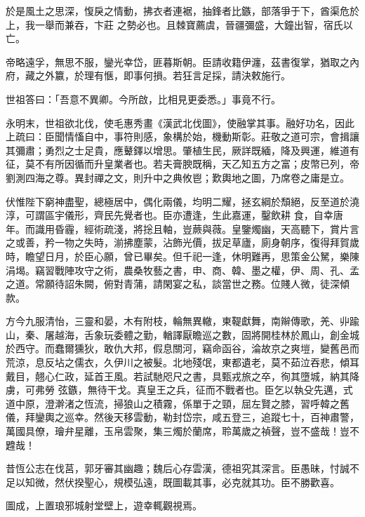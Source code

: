 \begin{pinyinscope}
 於是風土之思深，愎戾之情動，拂衣者連裾，抽鋒者比鏃，部落爭于下，酋渠危於上，我一舉而兼吞，卞莊
 之勢必也。且棘寶薦虞，晉疆彌盛，大鐘出智，宿氏以亡。



 帝略遠孚，無思不服，鑾光幸岱，匪暮斯朝。臣請收籍伊瀍，茲書復掌，猶取之內府，藏之外籝，於理有愜，即事何損。若狂言足採，請決敕施行。



 世祖答曰：「吾意不異卿。今所啟，比相見更委悉。」事竟不行。



 永明末，世祖欲北伐，使毛惠秀畫《漢武北伐圖》，使融掌其事。融好功名，因此上疏曰：臣聞情慉自中，事符則感，象構於始，機動斯彰。莊敬之道可宗，會揖讓其彌肅；勇烈之士足貴，應鼙鐸以增思。肇植生民，厥詳既緬，降及興運，維道有征，莫不有所因循而升皇業者也。若夫膏腴既稱，天乙知五方之富；皮幣已列，帝劉測四海之尊。異封禪之文，則升中之典攸鬯；歎輿地之圖，乃席卷之庸是立。



 伏惟陛下窮神盡聖，總極居中，偶化兩儀，均明二耀，拯玄綱於頹絕，反至道於澆淳，可謂區宇儀形，齊民先覺者也。臣亦遭逢，生此嘉運，鑿飲耕
 食，自幸唐年。而識用昏霾，經術疏淺，將捴且軸，豈蕨與薇。皇鑒燭幽，天高聽下，賞片言之或善，矜一物之失時，湔拂塵蒙，沾飾光價，拔足草廬，廁身朝序，復得拜賀歲時，瞻望日月，於臣心願，曾已畢矣。但千祀一逢，休明難再，思策金公駑，樂陳涓堨。竊習戰陣攻守之術，農桑牧藝之書，申、商、韓、墨之權，伊、周、孔、孟之道。常願待詔朱闕，俯對青蒲，請閑宴之私，談當世之務。位賤人微，徒深傾款。



 方今九服清怡，三靈和晏，木有附枝，輪無異轍，東鞮獻舞，南辮傳歌，羌、丱踰山，秦、屠越海，舌象玩委體之勤，輶譯厭瞻巡之數，固將開桂林於鳳山，創金城於西守。而蠢爾獯狄，敢仇大邦，假息關河，竊命函谷，淪故京之爽塏，變舊邑而荒涼，息反坫之儒衣，久伊川之被髮。北地殘氓，東都遺老，莫不茹泣吞悲，傾耳戴目，翹心仁政，延首王風。若試馳咫尺之書，具甄戎旅之卒，徇其墮城，納其降虜，可弗勞
 弦鏃，無待干戈。真皇王之兵，征而不戰者也。臣乞以執殳先邁，式道中原，澄澣渚之恆流，掃狼山之積霧，係單于之頸，屈左賢之膝，習呼韓之舊儀，拜鑾輿之巡幸。然後天移雲動，勒封岱宗，咸五登三，追蹤七十，百神肅警，萬國具僚，璯弁星離，玉帛雲聚，集三燭於蘭席，聆萬歲之禎聲，豈不盛哉！豈不韙哉！



 昔恆公志在伐莒，郭牙審其幽趣；魏后心存雲漢，德祖究其深言。臣愚昧，忖誠不足以知微，然伏揆聖心，規模弘遠，既圖載其事，必克就其功。臣不勝歡喜。



 圖成，上置琅邪城射堂壁上，遊幸輒觀視焉。




\end{pinyinscope}
